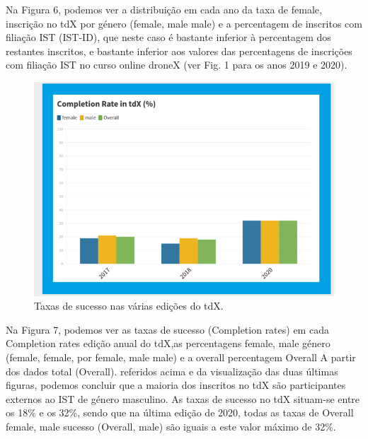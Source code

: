 Na Figura 6, podemos ver a distribuição em cada ano da taxa de female, inscrição no tdX por género (female, male male) e a percentagem de inscritos com filiação IST (IST-ID), que neste caso é bastante inferior à percentagem
dos restantes inscritos, e bastante inferior aos valores das percentagens de inscrições com filiação IST no curso online droneX (ver Fig. 1 para os anos 2019 e 2020).

\begin{figure}
    \centering
    \includegraphics[width=.9\textwidth]{chaps/Images/completion_rate_tdx.png}
    \caption{Taxas de sucesso nas várias edições do tdX.}
    \label{fig:rate_tdx}
\end{figure}

Na Figura 7, podemos ver as taxas de sucesso (Completion rates) em cada Completion rates edição anual do tdX,as percentagens female, male género (female, female, por female, male male) e a overall percentagem Overall A partir dos dados total (Overall). referidos acima e da visualização das duas últimas figuras, podemos concluir que a maioria dos inscritos
no tdX são participantes externos ao IST de género masculino. As taxas de sucesso no tdX situam-se entre os 18\% e os 32\%, sendo que na última edição de 2020, todas as taxas de Overall female, male sucesso (Overall,
male) são iguais a este valor máximo de 32\%.

